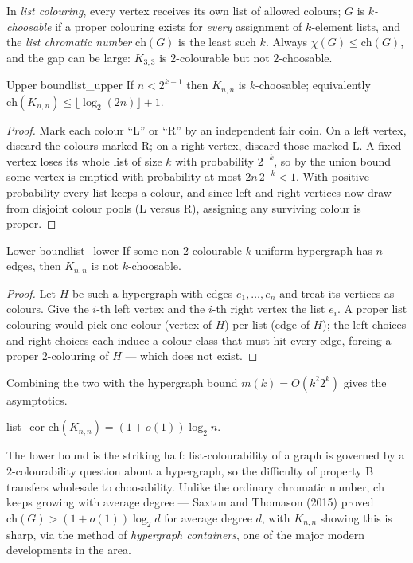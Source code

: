In \emph{list colouring}, every vertex receives its own list of allowed colours;
$G$ is \emph{$k$-choosable} if a proper colouring exists for \emph{every}
assignment of $k$-element lists, and the \emph{list chromatic number}
$\mathrm{ch}(G)$ is the least such $k$. Always $\chi(G)\le\mathrm{ch}(G)$, and
the gap can be large: $K_{3,3}$ is $2$-colourable but not $2$-choosable.

\begin{theorem}{Upper bound}{list_upper}
If $n<2^{k-1}$ then $K_{n,n}$ is $k$-choosable; equivalently
$\mathrm{ch}(K_{n,n})\le\lfloor\log_2(2n)\rfloor+1$.
\end{theorem}

\begin{proof}
Mark each colour ``L'' or ``R'' by an independent fair coin. On a left vertex,
discard the colours marked R; on a right vertex, discard those marked L. A
fixed vertex loses its whole list of size $k$ with probability $2^{-k}$, so by
the union bound some vertex is emptied with probability at most $2n\,2^{-k}<1$.
With positive probability every list keeps a colour, and since left and right
vertices now draw from disjoint colour pools (L versus R), assigning any
surviving colour is proper.
\end{proof}

\begin{theorem}{Lower bound}{list_lower}
If some non-$2$-colourable $k$-uniform hypergraph has $n$ edges, then $K_{n,n}$
is not $k$-choosable.
\end{theorem}

\begin{proof}
Let $H$ be such a hypergraph with edges $e_1,\dots,e_n$ and treat its vertices
as colours. Give the $i$-th left vertex and the $i$-th right vertex the list
$e_i$. A proper list colouring would pick one colour (vertex of $H$) per list
(edge of $H$); the left choices and right choices each induce a colour class
that must hit every edge, forcing a proper $2$-colouring of $H$ --- which does
not exist.
\end{proof}

Combining the two with the hypergraph bound $m(k)=O(k^2 2^k)$ gives the
asymptotics.

\begin{corollary}{}{list_cor}
$\mathrm{ch}(K_{n,n})=(1+o(1))\log_2 n.$
\end{corollary}

\begin{insight}
The lower bound is the striking half: list-colourability of a graph is governed
by a $2$-colourability question about a hypergraph, so the difficulty of
property B transfers wholesale to choosability. Unlike the ordinary chromatic
number, $\mathrm{ch}$ keeps growing with average degree --- Saxton and Thomason
(2015) proved $\mathrm{ch}(G)>(1+o(1))\log_2 d$ for average degree $d$, with
$K_{n,n}$ showing this is sharp, via the method of \emph{hypergraph
containers}, one of the major modern developments in the area.
\end{insight}

